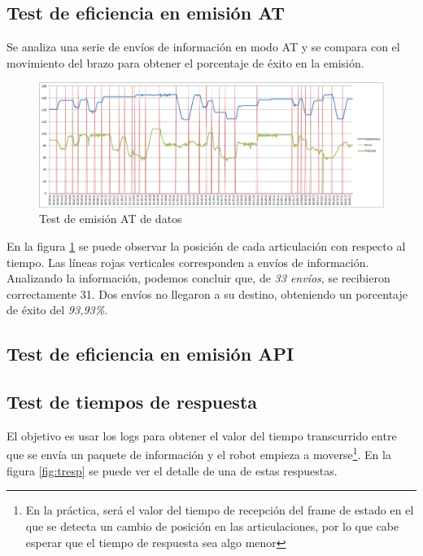 \subsection{Test de eficiencia en emisión AT}\label{subsec:temat}

Se analiza una serie de envíos de información en modo AT y se compara con el movimiento del brazo para obtener el porcentaje de éxito en la emisión.

\begin{figure}[tb]
\centering
\includegraphics[width=1.1\textwidth]{figuras/temat.png}
\caption{Test de emisión AT de datos}
\label{fig:temat}
\end{figure}

En la figura \ref{fig:temat} se puede observar la posición de cada articulación con respecto al tiempo. Las líneas rojas verticales corresponden a envíos de información. Analizando la información, podemos concluir que, de \textit{33 envíos}, se recibieron correctamente 31. Dos envíos no llegaron a su destino, obteniendo un porcentaje de éxito del \textit{93,93\%}.

\subsection{Test de eficiencia en emisión API}


\subsection{Test de tiempos de respuesta}

El objetivo es usar los logs para obtener el valor del tiempo transcurrido entre que se envía un paquete de información y el robot empieza a moverse\footnote{En la práctica, será el valor del tiempo de recepción del frame de estado en el que se detecta un cambio de posición en las articulaciones, por lo que cabe esperar que el tiempo de respuesta sea algo menor}. En la figura \ref{fig:tresp} se puede ver el detalle de una de estas respuestas.

